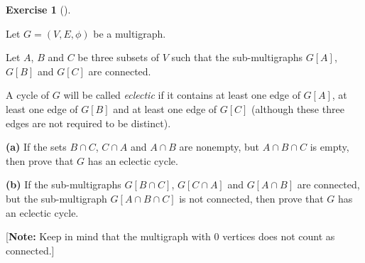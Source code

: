 \documentclass[numbers=enddot,12pt,final,onecolumn,notitlepage]{scrartcl}%
\newcounter{exer}
\theoremstyle{definition}
\newtheorem{exmp}[exer]{Exercise}
\newenvironment{exercise}[1][]
{\begin{exmp}[#1]\begin{leftbar}}
{\end{leftbar}\end{exmp}}
\newcommand{\tup}[1]{\left( #1 \right)}
\newcommand{\ive}[1]{\left[ #1 \right]}
\begin{document}
\begin{exercise} \label{exe.mt2.eclectic-cycle}
Let $G = \tup{V, E, \phi}$ be a multigraph.

Let $A$, $B$ and $C$ be three subsets of $V$ such that the
sub-multigraphs $G \ive{A}$, $G \ive{B}$ and $G \ive{C}$ are
connected.

A cycle of $G$ will be called \textit{eclectic} if it contains at
least one edge of $G \ive{A}$, at least one edge of $G \ive{B}$ and
at least one edge of $G \ive{C}$ (although these three edges are not
required to be distinct).

\textbf{(a)} If the sets $B \cap C$, $C \cap A$ and $A \cap B$ are
nonempty, but $A \cap B \cap C$ is empty, then prove that $G$ has an
eclectic cycle.

\textbf{(b)} If the sub-multigraphs
$G \ive{B \cap C}$, $G \ive{C \cap A}$
and $G \ive{A \cap B}$ are connected, but the sub-multigraph
$G \ive{A \cap B \cap C}$ is not connected, then prove that $G$ has
an eclectic cycle.

[\textbf{Note:} Keep in mind that the multigraph with $0$ vertices
does not count as connected.]
\end{exercise}
\end{document}
